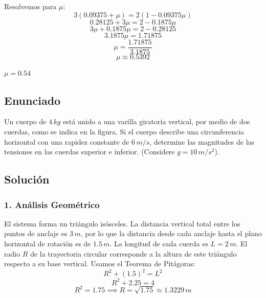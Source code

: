 \documentclass[12pt, a4paper]{article}
\begin{document}
Resolvemos para $\mu$:
$$ 3 (0.09375 + \mu) = 2 (1 - 0.09375 \mu) $$
$$ 0.28125 + 3 \mu = 2 - 0.1875 \mu $$
$$ 3 \mu + 0.1875 \mu = 2 - 0.28125 $$
$$ 3.1875 \mu = 1.71875 $$
$$ \mu = \frac{1.71875}{3.1875} $$
$$ \mu \approx 0.5392 $$

\begin{tcolorbox}[colback=green!5!white, colframe=green!50!black, title=Respuesta Final]
\centering \Large $\mu = 0.54$
\end{tcolorbox}

\newpage

\subsection*{Enunciado}
Un cuerpo de $4 \, \si{kg}$ está unido a una varilla giratoria vertical, por medio de dos cuerdas, como se indica en la figura. Si el cuerpo describe una circunferencia horizontal con una rapidez constante de $6 \, \si{m/s}$, determine las magnitudes de las tensiones en las cuerdas superior e inferior. (Considere $g = 10 \, \si{m/s^2}$).

\begin{center}
\end{center}

\subsection*{Solución}

\subsubsection*{1. Análisis Geométrico}
El sistema forma un triángulo isósceles. La distancia vertical total entre los puntos de anclaje es $3 \, \si{m}$, por lo que la distancia desde cada anclaje hasta el plano horizontal de rotación es de $1.5 \, \si{m}$.
La longitud de cada cuerda es $L = 2 \, \si{m}$.
El radio $R$ de la trayectoria circular corresponde a la altura de este triángulo respecto a su base vertical. Usamos el Teorema de Pitágoras:
$$ R^2 + (1.5)^2 = L^2 $$
$$ R^2 + 2.25 = 4 $$
$$ R^2 = 1.75 \implies R = \sqrt{1.75} \approx 1.3229 \, \si{m} $$
\end{document}
